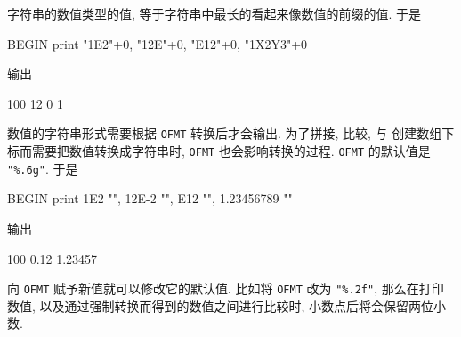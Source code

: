 字符串的数值类型的值, 等于字符串中最长的看起来像数值的前缀的值. 于是
\begin{myverb}
    BEGIN { print "1E2"+0, "12E"+0, "E12"+0, "1X2Y3"+0 }
\end{myverb}
输出
\begin{myverb}
    100 12 0 1
\end{myverb}

数值的字符串形式需要根据 \verb'OFMT' 转换后才会输出. 为了拼接, 比较, 与
创建数组下标而需要把数值转换成字符串时, \verb'OFMT' 也会影响转换的过程.
\verb'OFMT' 的默认值是 \verb'"%.6g"'. 于是
\begin{myverb}
    BEGIN { print 1E2 "", 12E-2 "", E12 "", 1.23456789 "" }
\end{myverb}
输出
\begin{myverb}
    100 0.12  1.23457
\end{myverb}
向 \verb'OFMT' 赋予新值就可以修改它的默认值. 比如将 \verb'OFMT' 改为
\verb'"%.2f"', 那么在打印数值, 以及通过强制转换而得到的数值之间进行比较时,
小数点后将会保留两位小数.
